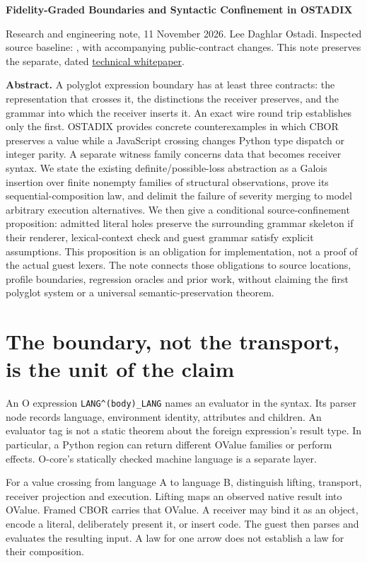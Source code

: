 \documentclass[11pt]{article}
\begin{document}
{\LARGE\bfseries Fidelity-Graded Boundaries and Syntactic Confinement in OSTADIX}\par\vspace{0.5em}

Research and engineering note, 11 November 2026. Lee Daghlar Ostadi. Inspected source baseline: \texttt{}, with accompanying public-contract changes. This note preserves the separate, dated \href{../../Ostadix-lang_Technical_Whitepaper.pdf}{technical whitepaper}.

\textbf{Abstract.} A polyglot expression boundary has at least three contracts: the representation that crosses it, the distinctions the receiver preserves, and the grammar into which the receiver inserts it. An exact wire round trip establishes only the first. OSTADIX provides concrete counterexamples in which CBOR preserves a value while a JavaScript crossing changes Python type dispatch or integer parity. A separate witness family concerns data that becomes receiver syntax. We state the existing definite/possible-loss abstraction as a Galois insertion over finite nonempty families of structural observations, prove its sequential-composition law, and delimit the failure of severity merging to model arbitrary execution alternatives. We then give a conditional source-confinement proposition: admitted literal holes preserve the surrounding grammar skeleton if their renderer, lexical-context check and guest grammar satisfy explicit assumptions. This proposition is an obligation for implementation, not a proof of the actual guest lexers. The note connects those obligations to source locations, profile boundaries, regression oracles and prior work, without claiming the first polyglot system or a universal semantic-preservation theorem.

\section{The boundary, not the transport, is the unit of the claim}

An O expression \texttt{LANG\textasciicircum{}(body)\_LANG} names an evaluator in the syntax. Its parser node records language, environment identity, attributes and children. An evaluator tag is not a static theorem about the foreign expression's result type. In particular, a Python region can return different OValue families or perform effects. O-core's statically checked machine language is a separate layer.

For a value crossing from language A to language B, distinguish lifting, transport, receiver projection and execution. Lifting maps an observed native result into OValue. Framed CBOR carries that OValue. A receiver may bind it as an object, encode a literal, deliberately present it, or insert code. The guest then parses and evaluates the resulting input. A law for one arrow does not establish a law for their composition.
\end{document}
